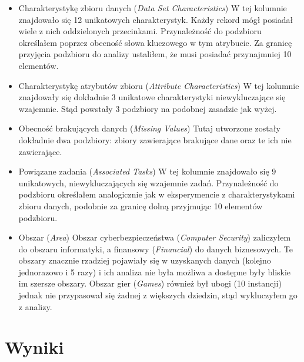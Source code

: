 \begin{itemize}
  \item Charakterystykę zbioru danych (\emph{Data Set Characteristics})
        W tej kolumnie znajdowało się 12 unikatowych charakterystyk.
        Każdy rekord mógł posiadał wiele z nich oddzielonych przecinkami.
        Przynależność do podzbioru określałem poprzez obecność słowa kluczowego w tym atrybucie.
        Za granicę przyjęcia podzbioru do analizy ustaliłem, że musi posiadać przynajmniej 10 elementów.

  \item Charakterystykę atrybutów zbioru (\emph{Attribute Characteristics})
        W tej kolumnie znajdowały się dokładnie 3 unikatowe charakterystyki niewykluczające się wzajemnie.
        Stąd powstały 3 podzbiory na podobnej zasadzie jak wyżej.

  \item Obecność brakujących danych (\emph{Missing Values})
        Tutaj utworzone zostały dokładnie dwa podzbiory: zbiory zawierające brakujące dane oraz te ich nie zawierające.

  \item Powiązane zadania (\emph{Associated Tasks})
        W tej kolumnie znajdowało się 9 unikatowych, niewykluczających się wzajemnie zadań.
        Przynależność do podzbioru określałem analogicznie jak w eksperymencie z charakterystykami zbioru danych, podobnie za granicę dolną przyjmując 10 elementów podzbioru.

  \item Obszar (\emph{Area})
        Obszar cyberbezpieczeństwa (\emph{Computer Security}) zaliczyłem do obszaru informatyki, a finansowy (\emph{Financial}) do danych biznesowych.
        Te obszary znacznie rzadziej pojawiały się w uzyskanych danych (kolejno jednorazowo i 5 razy) i ich analiza nie była możliwa a dostępne były bliskie im szersze obszary.
        Obszar gier (\emph{Games}) również był ubogi (10 instancji) jednak nie przypasował się żadnej z większych dziedzin, stąd wykluczyłem go z analizy.

\end{itemize}


\section{Wyniki}

